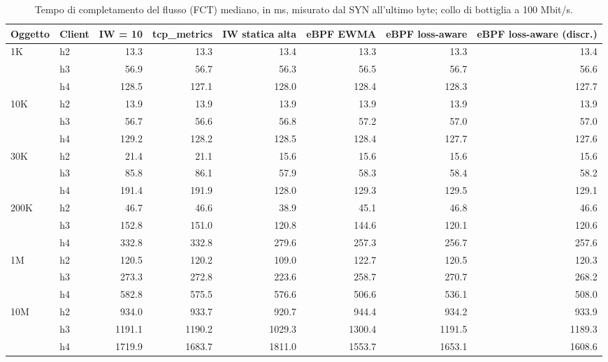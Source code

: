 \begin{table}[htbp]
  \centering
  \caption{Tempo di completamento del flusso (FCT) mediano, in ms, misurato dal SYN all'ultimo byte; collo di bottiglia a 100 Mbit/s.}
  \label{tab:fct-med-100}
  \begin{tabular}{llrrrrrr}
    \toprule
    Oggetto & Client & IW = 10 & tcp\_metrics & IW statica alta & eBPF EWMA & eBPF loss-aware & eBPF loss-aware (discr.) \\
    \midrule
    1K & h2 & 13.3 & 13.3 & 13.4 & 13.3 & 13.3 & 13.4 \\
     & h3 & 56.9 & 56.7 & 56.3 & 56.5 & 56.7 & 56.6 \\
     & h4 & 128.5 & 127.1 & 128.0 & 128.4 & 128.3 & 127.7 \\
    \addlinespace
    10K & h2 & 13.9 & 13.9 & 13.9 & 13.9 & 13.9 & 13.9 \\
     & h3 & 56.7 & 56.6 & 56.8 & 57.2 & 57.0 & 57.0 \\
     & h4 & 129.2 & 128.2 & 128.5 & 128.4 & 127.7 & 127.6 \\
    \addlinespace
    30K & h2 & 21.4 & 21.1 & 15.6 & 15.6 & 15.6 & 15.6 \\
     & h3 & 85.8 & 86.1 & 57.9 & 58.3 & 58.4 & 58.2 \\
     & h4 & 191.4 & 191.9 & 128.0 & 129.3 & 129.5 & 129.1 \\
    \addlinespace
    200K & h2 & 46.7 & 46.6 & 38.9 & 45.1 & 46.8 & 46.6 \\
     & h3 & 152.8 & 151.0 & 120.8 & 144.6 & 120.1 & 120.6 \\
     & h4 & 332.8 & 332.8 & 279.6 & 257.3 & 256.7 & 257.6 \\
    \addlinespace
    1M & h2 & 120.5 & 120.2 & 109.0 & 122.7 & 120.5 & 120.3 \\
     & h3 & 273.3 & 272.8 & 223.6 & 258.7 & 270.7 & 268.2 \\
     & h4 & 582.8 & 575.5 & 576.6 & 506.6 & 536.1 & 508.0 \\
    \addlinespace
    10M & h2 & 934.0 & 933.7 & 920.7 & 944.4 & 934.2 & 933.9 \\
     & h3 & 1191.1 & 1190.2 & 1029.3 & 1300.4 & 1191.5 & 1189.3 \\
     & h4 & 1719.9 & 1683.7 & 1811.0 & 1553.7 & 1653.1 & 1608.6 \\
    \bottomrule
  \end{tabular}
\end{table}
